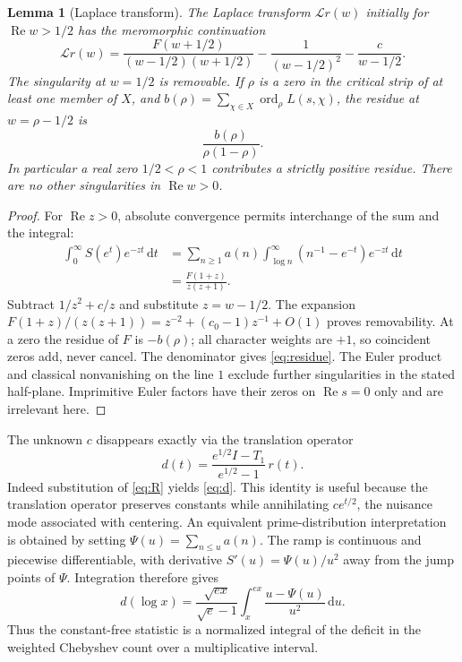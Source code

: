\documentclass[11pt]{article}
\newtheorem{lemma}[theorem]{Lemma}
\theoremstyle{remark}\newtheorem{remark}[theorem]{Remark}
\newcommand{\ord}{\operatorname{ord}}
\newcommand{\Rea}{\operatorname{Re}}
\newcommand{\dd}{\,\mathrm d}
\begin{document}
\begin{lemma}[Laplace transform]\label{lem:laplace}
The Laplace transform $\mathcal Lr(w)$ initially for $\Rea w>1/2$ has the meromorphic continuation
\begin{equation}\label{eq:laplace}
 \mathcal Lr(w)=\frac{F(w+1/2)}{(w-1/2)(w+1/2)}
   -\frac1{(w-1/2)^2}-\frac c{w-1/2}.
\end{equation}
The singularity at $w=1/2$ is removable. If $\rho$ is a zero in the critical strip of at least one member of $X$, and $b(\rho)=\sum_{\chi\in X}\ord_\rho L(s,\chi)$, the residue at $w=\rho-1/2$ is
\begin{equation}\label{eq:residue}
 \frac{b(\rho)}{\rho(1-\rho)}.
\end{equation}
In particular a real zero $1/2<\rho<1$ contributes a strictly positive residue. There are no other singularities in $\Rea w>0$.
\end{lemma}
\begin{proof}
For $\Rea z>0$, absolute convergence permits interchange of the sum and the integral:
\begin{align*}
 \int_0^\infty S(e^t)e^{-zt}\dd t
 &=\sum_{n\ge1}a(n)\int_{\log n}^\infty (n^{-1}-e^{-t})e^{-zt}\dd t\\
 &=\frac{F(1+z)}{z(z+1)}.
\end{align*}
Subtract $1/z^2+c/z$ and substitute $z=w-1/2$. The expansion $F(1+z)/(z(z+1))=z^{-2}+(c_0-1)z^{-1}+O(1)$ proves removability. At a zero the residue of $F$ is $-b(\rho)$; all character weights are $+1$, so coincident zeros add, never cancel. The denominator gives \eqref{eq:residue}. The Euler product and classical nonvanishing on the line $1$ exclude further singularities in the stated half-plane. Imprimitive Euler factors have their zeros on $\Rea s=0$ only and are irrelevant here.
\end{proof}

The unknown $c$ disappears exactly via the translation operator
\begin{equation}\label{eq:D}
 d(t)=\frac{e^{1/2}I-T_1}{e^{1/2}-1}\,r(t).
\end{equation}
Indeed substitution of \eqref{eq:R} yields \eqref{eq:d}. This identity is useful because the translation operator preserves constants while annihilating $ce^{t/2}$, the nuisance mode associated with centering. An equivalent prime-distribution interpretation is obtained by setting $\Psi(u)=\sum_{n\le u}a(n)$. The ramp is continuous and piecewise differentiable, with derivative $S'(u)=\Psi(u)/u^2$ away from the jump points of $\Psi$. Integration therefore gives
\[
 d(\log x)=\frac{\sqrt{ex}}{\sqrt e-1}
 \int_x^{ex}\frac{u-\Psi(u)}{u^2}\dd u.
\]
Thus the constant-free statistic is a normalized integral of the deficit in the weighted Chebyshev count over a multiplicative interval.
\end{document}
